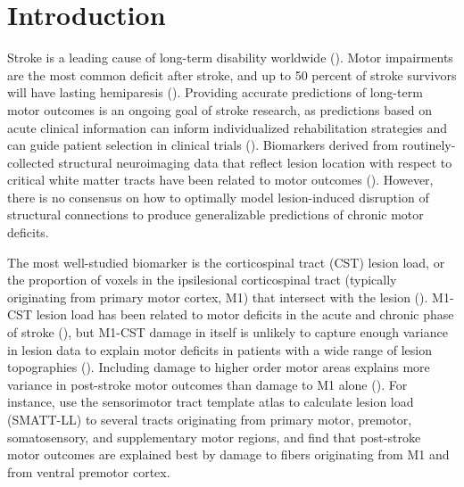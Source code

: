 \documentclass[phd,tocprelim]{cornell}
\begin{document}
\section{Introduction}
Stroke is a leading cause of long-term disability worldwide (\cite{Katan2018-qn}). Motor impairments are the most common deficit after stroke, and up to 50 percent of stroke survivors will have lasting hemiparesis (\cite{Kelly-Hayes2003-sp}). Providing accurate predictions of long-term motor outcomes is an ongoing goal of stroke research, as predictions based on acute clinical information can inform individualized rehabilitation strategies and can guide patient selection in clinical trials (\cite{Bonkhoff2022-op, Boyd2017-gs}). Biomarkers derived from routinely-collected structural neuroimaging data that reflect lesion location with respect to critical white matter tracts have been related to motor outcomes (\cite{Tozlu2020-qa, Kuceyeski2016-vj, Griffis2019-cy, Salvalaggio2020-pe, Bowren2022-rs}). However, there is no consensus on how to optimally model lesion-induced disruption of structural connections to produce generalizable predictions of chronic motor deficits. 

The most well-studied biomarker is the corticospinal tract (CST) lesion load, or the proportion of voxels in the ipsilesional corticospinal tract (typically originating from primary motor cortex, M1) that intersect with the lesion (\cite{Zhu2010-qh, Feng2015-du, Findlater2019-je, Lam2018-xh, Pineiro2000-dv}). M1-CST lesion load has been related to motor deficits in the acute and chronic phase of stroke (\cite{Boyd2017-gs, Kim2017-xe}), but M1-CST damage in itself is unlikely to capture enough variance in lesion data to explain motor deficits in patients with a wide range of lesion topographies (\cite{Park2016-te,Findlater2019-je}). Including damage to higher order motor areas explains more variance in post-stroke motor outcomes than damage to M1 alone (\cite{Ito2022-em,  Rondina2016-ds, Rondina2017-ij, Schulz2012-yy, Park2016-te}). For instance, \cite{Ito2022-em} use the sensorimotor tract template atlas to calculate lesion load (SMATT-LL) to several tracts originating from primary motor, premotor, somatosensory, and supplementary motor regions, and find that post-stroke motor outcomes are explained best by damage to fibers originating from M1 and from ventral premotor cortex. 
\end{document}
